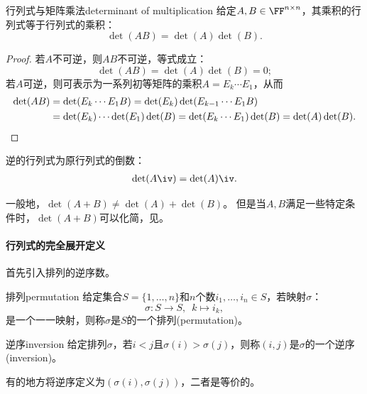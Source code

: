 \begin{theorem}{行列式与矩阵乘法}{determinant of multiplication}
	给定$A,B\in\FF^{n\times n}$，其乘积的行列式等于行列式的乘积：
	\begin{equation}
		\det(AB)=\det(A)\det(B).
	\end{equation}
\end{theorem}
\begin{proof}
	若$A$不可逆，则$AB$不可逆，等式成立：
	\[
		\det(AB)=\det(A)\det(B)=0;
	\]
	若$A$可逆，则可表示为一系列初等矩阵的乘积$A=E_k\cdots E_1$，从而
	\begin{align*}
		\det(AB)&=\det(E_k\cdots E_1B)=\det(E_k)\det(E_{k-1}\cdots E_1B)\\
		&=\det(E_k)\cdots\det(E_1)\det(B)=\det(E_k\cdots E_1)\det(B)=\det(A)\det(B).
		\qedhere
	\end{align*}
\end{proof}
\begin{corollary}
	逆的行列式为原行列式的倒数：
	\begin{align}
		\det(A\iv)=\det(A)\iv.
	\end{align}
\end{corollary}

\begin{remark}
	一般地，$\det(A+B)\neq\det(A)+\det(B)$。
	但是当$A,B$满足一些特定条件时，$\det(A+B)$可以化简，见。
\end{remark}

\paragraph{行列式的完全展开定义}

首先引入排列的逆序数。

\begin{definition}
	{排列}{permutation}
	给定集合$S=\{1,\ldots,n\}$和$n$个数$i_1,\ldots,i_n\in S$，若映射$\sigma$：
	\[
		\sigma:S\to S,\enspace k\mapsto i_k,
	\]
	是一个一一映射，则称$\sigma$是$S$的一个排列(permutation)。
\end{definition}
\begin{definition}
	{逆序}{inversion}
	给定排列$\sigma$，若$i<j$且$\sigma(i)>\sigma(j)$，则称$(i,j)$是$\sigma$的一个逆序(inversion)。
\end{definition}

\begin{remark}
	有的地方将逆序定义为$(\sigma(i),\sigma(j))$，二者是等价的。
\end{remark}

